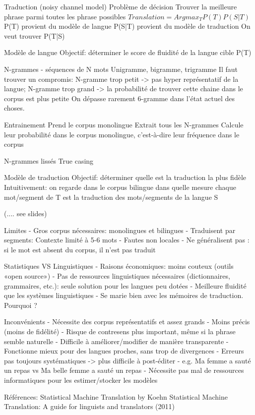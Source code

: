 Traduction (noisy channel model)
    Problème de décision
        Trouver la meilleure phrase parmi toutes les phrase possibles
        $Translation = Argmax_T P(T) P(S|T)$
        P(T) provient du modèle de langue
        P(S|T) provient du modèle de traduction
        On veut trouver P(T|S)

Modèle de langue
    Objectif: déterminer le score de fluidité de la langue cible P(T)

    N-grammes - séquences de N mots
        Unigramme, bigramme, trigramme
        Il faut trouver un compromis: N-gramme trop petit -> pas hyper représentatif de la langue; N-gramme trop grand -> la probabilité de trouver cette chaine dans le corpus est plus petite
        On dépasse rarement 6-gramme dans l'état actuel des choses.

    Entrainement
        Prend le corpus monolingue
        Extrait tous les N-grammes
        Calcule leur probabilité dans le corpus monolingue, c’est-à-dire leur fréquence dans le corpus

    N-grammes lissés
    True casing

Modèle de traduction
    Objectif: déterminer quelle est la traduction la plus fidèle
    Intuitivement: on regarde dans le corpus bilingue dans quelle mesure chaque mot/segment de T est la traduction des mots/segments de la langue S


(.... see slides)

Limites
    - Gros corpus nécessaires: monolingues et bilingues
    - Traduisent par segments: Contexte limité à 5-6 mots
    - Fautes non locales
    - Ne généralisent pas : si le mot est absent du corpus, il n’est pas traduit

Statistiques VS Linguistiques
    - Raisons économiques: moins couteux (outils «open source»)
    - Pas de ressources linguistiques nécessaires (dictionnaires, grammaires, etc.): seule solution pour les langues peu dotées
    - Meilleure fluidité que les systèmes linguistiques
    - Se marie bien avec les mémoires de traduction. Pourquoi ?

Inconvénients
    - Nécessite des corpus représentatifs et assez grands
    - Moins précis (moins de fidélité)
        - Risque de contresens plus important, même si la phrase semble naturelle
    - Difficile à améliorer/modifier de manière transparente
    - Fonctionne mieux pour des langues proches, sans trop de divergences
    - Erreurs pas toujours systématiques -> plus difficile à post-éditer
        - e.g. Ma femme a sauté un repas vs Ma belle femme a sauté un repas
    - Nécessite pas mal de ressources informatiques pour les estimer/stocker les modèles

Références:
    Statistical Machine Translation by Koehn
    Statistical Machine Translation: A guide for linguists and translators (2011)
